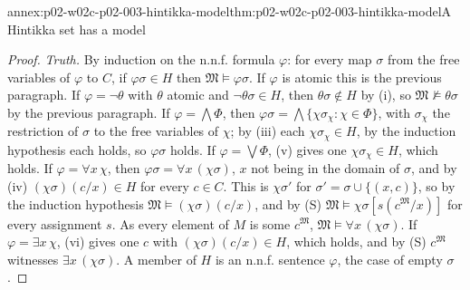 \begin{annexitem}{annex:p02-w02c-p02-003-hintikka-model}{thm:p02-w02c-p02-003-hintikka-model}{A Hintikka set has a model}
\begin{proof}
\emph{Truth.}  By induction on the n.n.f. formula \(\varphi\): for every
map \(\sigma\) from the free variables of \(\varphi\) to \(C\), if
\(\varphi\sigma\in H\) then \(\mathfrak M\models\varphi\sigma\).  If
\(\varphi\) is atomic this is the previous paragraph.  If \(\varphi=\neg\theta\)
with \(\theta\) atomic and \(\neg\theta\sigma\in H\), then
\(\theta\sigma\notin H\) by (i), so \(\mathfrak M\not\models\theta\sigma\)
by the previous paragraph.  If \(\varphi=\bigwedge\Phi\), then
\(\varphi\sigma=\bigwedge\{\chi\sigma_\chi:\chi\in\Phi\}\), with
\(\sigma_\chi\) the restriction of \(\sigma\) to the free variables of
\(\chi\); by (iii) each \(\chi\sigma_\chi\in H\), by the induction
hypothesis each holds, so \(\varphi\sigma\) holds.  If
\(\varphi=\bigvee\Phi\), (v) gives one \(\chi\sigma_\chi\in H\), which holds.
If \(\varphi=\forall x\,\chi\), then \(\varphi\sigma=\forall
x\,(\chi\sigma)\), \(x\) not being in the domain of \(\sigma\), and by (iv)
\((\chi\sigma)(c/x)\in H\) for every \(c\in C\).  This is
\(\chi\sigma'\) for \(\sigma'=\sigma\cup\{(x,c)\}\), so by the induction
hypothesis \(\mathfrak M\models(\chi\sigma)(c/x)\), and by (S)
\(\mathfrak M\models\chi\sigma[s(c^{\mathfrak M}/x)]\) for every
assignment \(s\).  As every element of \(M\) is some \(c^{\mathfrak M}\),
\(\mathfrak M\models\forall x\,(\chi\sigma)\).  If
\(\varphi=\exists x\,\chi\), (vi) gives one \(c\) with
\((\chi\sigma)(c/x)\in H\), which holds, and by (S) \(c^{\mathfrak M}\)
witnesses \(\exists x\,(\chi\sigma)\).  A member of \(H\) is an n.n.f.
sentence \(\varphi\), the case of empty \(\sigma\).
\end{proof}
\end{annexitem}

